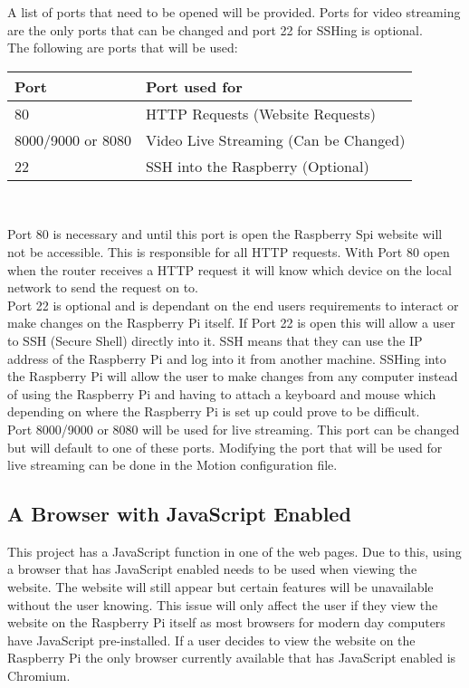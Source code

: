 \documentclass[12pt]{report}
\begin{document}
A list of ports that need to be opened will be provided. Ports for video streaming are the only ports that can be changed and port 22 for SSHing is optional. \\

The following are ports that will be used:

\begin{center}
    \begin{tabular}{ | l | p{7cm} |}
    \hline
    {\bf Port} & {\bf Port used for} \\ \hline
   80 & HTTP Requests (Website Requests) \\ \hline 
   8000/9000 or 8080 & Video Live Streaming (Can be Changed)\\ \hline
	22 & SSH into the Raspberry (Optional) \\ \hline
    \end{tabular}
    \\[0.5cm]
\end{center} 

Port 80 is necessary and until this port is open the Raspberry Spi website will not be accessible. This is responsible for all HTTP requests. With Port 80 open when the router receives a HTTP request it will know which device on the local network to send the request on to.\\

Port 22 is optional and is dependant on the end users requirements to interact or make changes on the Raspberry Pi itself. If Port 22 is open this will allow a user to SSH (Secure Shell) directly into it. SSH means that they can use the IP address of the Raspberry Pi and log into it from another machine. SSHing into the Raspberry Pi will allow the user to make changes from any computer instead of using the Raspberry Pi and having to attach a keyboard and mouse which depending on where the Raspberry Pi is set up could prove to be difficult.\\

Port 8000/9000 or 8080 will be used for live streaming. This port can be changed but will default to one of these ports. Modifying the port that will be used for live streaming can be done in the Motion configuration file.\\

\noindent
\subsection{A Browser with JavaScript Enabled}
\label{subsec:javascript}
This project has a JavaScript function in one of the web pages. Due to this, using a browser that has JavaScript enabled needs to be used when viewing the website. The website will still appear but certain features will be unavailable without the user knowing. This issue will only affect the user if they view the website on the Raspberry Pi itself as most browsers for modern day computers have JavaScript pre-installed. If a user decides to view the website on the Raspberry Pi the only browser currently available that has JavaScript enabled is Chromium.\\
%
%
\end{document}
